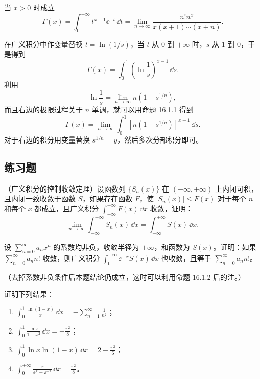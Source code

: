 \begin{xexample}[16.1.4]
当 $x>0$ 时成立
\[
  \Gamma(x)=\int_0^{+\infty}t^{x-1}\ee^{-t}\,\dd t
  =\lim_{n\to\infty}\frac{n!n^x}{x(x+1)\cdots(x+n)}.
\]
\end{xexample}

\begin{xproof}
在广义积分中作变量替换 $t=\ln(1/s)$，当 $t$ 从 $0$ 到 $+\infty$ 时，$s$ 从 $1$ 到 $0$，于是得到
\[
  \Gamma(x)=\int_0^1\left(\ln\frac1s\right)^{x-1}\,\dd s.
\]
利用
\[
  \ln\frac1s=\lim_{n\to\infty}n(1-s^{1/n}),
\]
而且右边的极限过程关于 $n$ 单调，就可以用命题 16.1.1 得到
\[
  \Gamma(x)=\lim_{n\to\infty}\int_0^1\left[n(1-s^{1/n})\right]^{x-1}\,\dd s.
\]
对于右边的积分用变量替换 $s^{1/n}=y$，然后多次分部积分即可。
\end{xproof}

\subsection{练习题}

\begin{xexercise}[1]
（广义积分的控制收敛定理）设函数列 $\{S_n(x)\}$ 在 $(-\infty,+\infty)$ 上内闭可积，且内闭一致收敛于函数 $S$，如果存在函数 $F$，使 $|S_n(x)|\leqslant F(x)$ 对于每个 $n$ 和每个 $x$ 都成立，且广义积分 $\int_{-\infty}^{+\infty}F(x)\,\dd x$ 收敛，证明：
\[
  \lim_{n\to\infty}\int_{-\infty}^{+\infty}S_n(x)\,\dd x
  =\int_{-\infty}^{+\infty}S(x)\,\dd x.
\]
\end{xexercise}

\begin{xexercise}[2]
设 $\sum_{n=0}^{\infty}a_nx^n$ 的系数均非负，收敛半径为 $+\infty$，和函数为 $S(x)$。证明：如果 $\sum_{n=0}^{\infty}a_nn!$ 收敛，则广义积分 $\int_0^{+\infty}\ee^{-x}S(x)\,\dd x$ 也收敛，且等于 $\sum_{n=0}^{\infty}a_nn!$。

（去掉系数非负条件后本题结论仍成立，这时可以利用命题 16.1.2 后的注。）
\end{xexercise}

\begin{xexercise}[3]
证明下列结果：
\begin{enumerate}[label=(\arabic*)]
\item $\displaystyle \int_0^1\frac{\ln(1-x)}x\,\dd x=-\sum_{n=1}^{\infty}\frac1{n^2}$；
\item $\displaystyle \int_0^1\frac{\ln x}{1-x^2}\,\dd x=-\frac{\pi^2}{8}$；
\item $\displaystyle \int_0^1\ln x\ln(1-x)\,\dd x=2-\frac{\pi^2}{6}$；
\item $\displaystyle \int_0^{+\infty}\frac{x}{\ee^x-\ee^{-x}}\,\dd x=\frac{\pi^2}{8}$。
\end{enumerate}
\end{xexercise}

